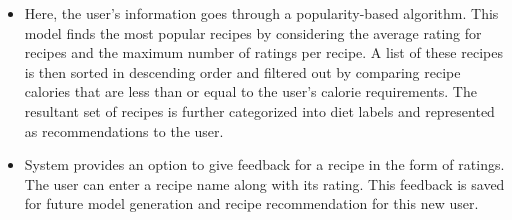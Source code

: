 \begin{itemize}
\item Here, the user's information goes through a popularity-based algorithm. This model finds the most popular recipes by considering the average rating for recipes and the maximum number of ratings per recipe. A list of these recipes is then sorted in descending order and filtered out by comparing recipe calories that are less than or equal to the user's calorie requirements. The resultant set of recipes is further categorized into diet labels and represented as recommendations to the user.
\item System provides an option to give feedback for a recipe in the form of ratings. The user can enter a recipe name along with its rating. This feedback is saved for future model generation and recipe recommendation for this new user.
\end{itemize}
